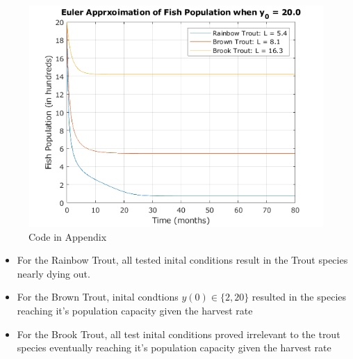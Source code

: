 \documentclass[letterpaper,12pt]{article}
\begin{document}
\begin{figure}[H]
    \centering
    \includegraphics{./figures/fig.4.1.4.png}
    \caption{Code in Appendix}
    \label{fig:10}
\end{figure}
\begin{itemize}
    \item For the Rainbow Trout, all tested inital conditions result in the Trout species nearly dying out.
    \item For the Brown Trout, inital condtions \(y(0) \in \{2, 20\}\) resulted in the species reaching it's population capacity given the harvest rate
    \item For the Brook Trout, all test inital conditions proved irrelevant to the trout species eventually reaching it's population capacity given the harvest rate
\end{itemize}
\end{document}
